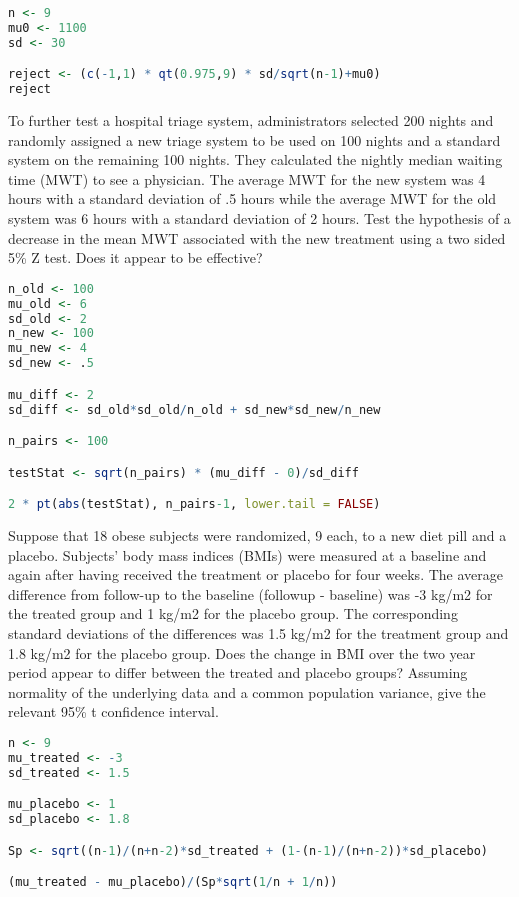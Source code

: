 \documentclass{homework}
\begin{document}
\begin{lstlisting}[language=R]
n <- 9
mu0 <- 1100
sd <- 30

reject <- (c(-1,1) * qt(0.975,9) * sd/sqrt(n-1)+mu0)
reject
\end{lstlisting}

\begin{tcolorbox}[title=Question 4]
To further test a hospital triage system, administrators selected 200 nights and randomly assigned a new triage system to be used on 100 nights and a standard system on the remaining 100 nights. They calculated the nightly median waiting time (MWT) to see a physician. The average MWT for the new system was 4 hours with a standard deviation of .5 hours while the average MWT for the old system was 6 hours with a standard deviation of 2 hours. Test the hypothesis of a decrease in the mean MWT associated with the new treatment using a two sided 5\% Z test. Does it appear to be effective?
\end{tcolorbox}

\begin{lstlisting}[language=R]
n_old <- 100
mu_old <- 6
sd_old <- 2 
n_new <- 100
mu_new <- 4
sd_new <- .5

mu_diff <- 2 
sd_diff <- sd_old*sd_old/n_old + sd_new*sd_new/n_new

n_pairs <- 100

testStat <- sqrt(n_pairs) * (mu_diff - 0)/sd_diff

2 * pt(abs(testStat), n_pairs-1, lower.tail = FALSE) 
\end{lstlisting}

\begin{tcolorbox}[title=Question 5]
Suppose that 18 obese subjects were randomized, 9 each, to a new diet pill and a placebo. Subjects’ body mass indices (BMIs) were measured at a baseline and again after having received the treatment or placebo for four weeks. The average difference from follow-up to the baseline (followup - baseline) was -3 kg/m2 for the treated group and 1 kg/m2 for the placebo group. The corresponding standard deviations of the differences was 1.5 kg/m2 for the treatment group and 1.8 kg/m2 for the placebo group. Does the change in BMI over the two year period appear to differ between the treated and placebo groups?  Assuming normality of the underlying data and a common population variance, give the relevant 95\% t confidence interval.
\end{tcolorbox}

\begin{lstlisting}[language=R]
n <- 9
mu_treated <- -3
sd_treated <- 1.5

mu_placebo <- 1
sd_placebo <- 1.8

Sp <- sqrt((n-1)/(n+n-2)*sd_treated + (1-(n-1)/(n+n-2))*sd_placebo)

(mu_treated - mu_placebo)/(Sp*sqrt(1/n + 1/n))
\end{lstlisting}
\end{document}
